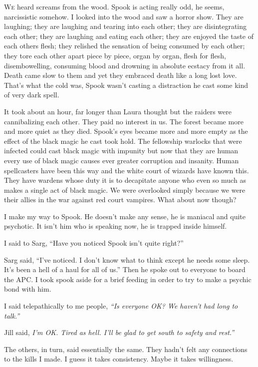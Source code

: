 \lettrine[lines=2,lraise=0]{W}e heard screams from the wood. Spook is acting really odd, he seems, narcissistic somehow. I looked into the wood and saw a horror show. They are laughing; they are laughing and tearing into each other; they are disintegrating each other; they are laughing and eating each other; they are enjoyed the taste of each others flesh; they relished the sensation of being consumed by each other; they tore each other apart piece by piece, organ by organ, flesh for flesh, disembowelling, consuming blood and drowning in absolute ecstacy from it all. Death came slow to them and yet they embraced death like a long lost love. That's what the cold was, Spook wasn't casting a distraction he cast some kind of very dark spell.

It took about an hour, far longer than Laura thought but the raiders were cannibalizing each other. They paid no interest in us. The forest became more and more quiet as they died. Spook's eyes became more and more empty as the effect of the black magic he cast took hold. The fellowship warlocks that were infected could cast black magic with impunity but now that they are human every use of black magic causes ever greater corruption and insanity. Human spellcasters have been this way and the white court of wizards have known this. They have wardens whose duty it is to decapitate anyone who even so much as makes a single act of black magic. We  were overlooked simply because we were their allies in the war against red court vampires.  What about now though?

I make my way to Spook. He doesn't make any sense, he is maniacal and quite psychotic. It isn't him who is speaking now, he is trapped inside himself.




I said to Sarg, ``Have you noticed Spook isn't quite right?''

Sarg said, ``I've noticed. I don't know what to think except he needs some sleep. It's been a hell of a haul for all of us.'' Then he spoke out to everyone to board the APC. I took spook aside for a brief feeding in order to try to make a psychic bond with him.

I said telepathically to me people, \textit{``Is everyone OK? We haven't had long to talk.''}

Jill said, \textit{I'm OK. Tired as hell. I'll be glad to get south to safety and rest.''}

The others, in turn, said essentially the same. They hadn't felt any connections to the kills I made. I guess it takes consistency. Maybe it takes willingness. 

